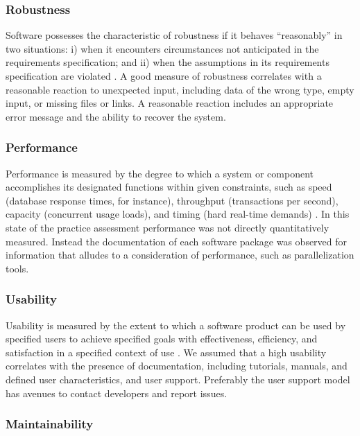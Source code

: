 \documentclass[final, 3p, times, authoryear]{elsarticle}
\begin{document}
\subsubsection{Robustness}

Software possesses the characteristic of robustness if it behaves ``reasonably''
in two situations: i) when it encounters circumstances not anticipated in the
requirements specification; and ii) when the assumptions in its requirements
specification are violated \citep{boehm2007software, ghezzi1991fundamentals}. A
good measure of robustness correlates with a reasonable reaction to unexpected
input, including data of the wrong type, empty input, or missing files or links.
A reasonable reaction includes an appropriate error message and the ability to
recover the system.

\subsubsection{Performance}

Performance is measured by the degree to which a system or component
accomplishes its designated functions within given constraints, such as speed
(database response times, for instance), throughput (transactions per second),
capacity (concurrent usage loads), and timing (hard real-time demands)
\citep{IEEEStdGlossarySET1990, wiegers2003softreq}. In this state of the
practice assessment performance was not directly quantitatively measured.
Instead the documentation of each software package was observed for information
that alludes to a consideration of performance, such as parallelization tools. 

\subsubsection{Usability}

Usability is measured by the extent to which a software product can be used by
specified users to achieve specified goals with effectiveness, efficiency, and
satisfaction in a specified context of use \citep{nielsonusability}. We assumed
that a high usability correlates with the presence of documentation,
including tutorials, manuals, and defined user characteristics, and user
support. Preferably the user support model has avenues to contact developers and
report issues.

\subsubsection{Maintainability}
\end{document}
